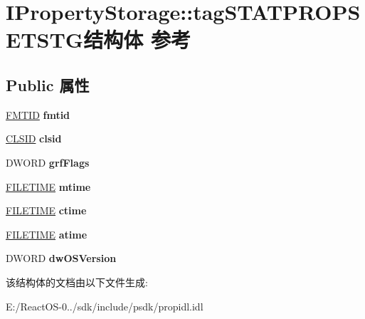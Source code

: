 \hypertarget{struct_i_property_storage_1_1tag_s_t_a_t_p_r_o_p_s_e_t_s_t_g}{}\section{I\+Property\+Storage\+:\+:tag\+S\+T\+A\+T\+P\+R\+O\+P\+S\+E\+T\+S\+T\+G结构体 参考}
\label{struct_i_property_storage_1_1tag_s_t_a_t_p_r_o_p_s_e_t_s_t_g}
\subsection*{Public 属性}
\begin{DoxyCompactItemize}
\item 
\mbox{\label{struct_i_property_storage_1_1tag_s_t_a_t_p_r_o_p_s_e_t_s_t_g_a06df17b7f24db0a1eb5e28bbdcee9be0}} 
\hyperlink{interface_g_u_i_d}{F\+M\+T\+ID} {\bfseries fmtid}
\item 
\mbox{\label{struct_i_property_storage_1_1tag_s_t_a_t_p_r_o_p_s_e_t_s_t_g_a15a9bd9b5210a77b2da6f168d53a0f6f}} 
\hyperlink{struct___i_i_d}{C\+L\+S\+ID} {\bfseries clsid}
\item 
\mbox{\label{struct_i_property_storage_1_1tag_s_t_a_t_p_r_o_p_s_e_t_s_t_g_a6eb5c8d9fe099b3256490ae7dd766e43}} 
D\+W\+O\+RD {\bfseries grf\+Flags}
\item 
\mbox{\label{struct_i_property_storage_1_1tag_s_t_a_t_p_r_o_p_s_e_t_s_t_g_a01b12a51d1502b56b9732f75a10c6b9a}} 
\hyperlink{struct___f_i_l_e_t_i_m_e}{F\+I\+L\+E\+T\+I\+ME} {\bfseries mtime}
\item 
\mbox{\label{struct_i_property_storage_1_1tag_s_t_a_t_p_r_o_p_s_e_t_s_t_g_aaef1391a2f689717f0c40fcd1486ab5e}} 
\hyperlink{struct___f_i_l_e_t_i_m_e}{F\+I\+L\+E\+T\+I\+ME} {\bfseries ctime}
\item 
\mbox{\label{struct_i_property_storage_1_1tag_s_t_a_t_p_r_o_p_s_e_t_s_t_g_a8f1f9182cfbd40fe72320c63928e6997}} 
\hyperlink{struct___f_i_l_e_t_i_m_e}{F\+I\+L\+E\+T\+I\+ME} {\bfseries atime}
\item 
\mbox{\label{struct_i_property_storage_1_1tag_s_t_a_t_p_r_o_p_s_e_t_s_t_g_a0172b54a1be3ad423a94f618e49fe5f1}} 
D\+W\+O\+RD {\bfseries dw\+O\+S\+Version}
\end{DoxyCompactItemize}


该结构体的文档由以下文件生成\+:\begin{DoxyCompactItemize}
\item 
E\+:/\+React\+O\+S-\/0../sdk/include/psdk/propidl.\+idl\end{DoxyCompactItemize}
